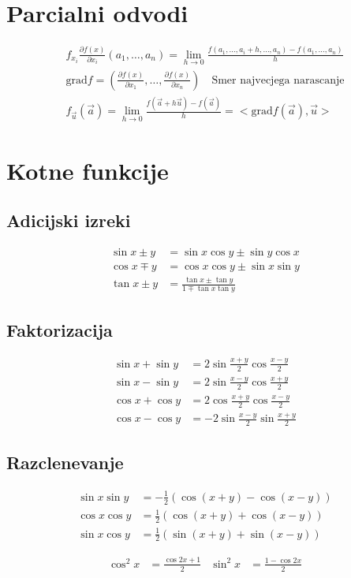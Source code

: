 \documentclass[a4paper,oneside,8pt]{extarticle}
\theoremstyle{definition}
\newcommand{\dpar}[2]{\ensuremath{\frac{\partial #1}{\partial #2}}}
\newcommand\okr[1]{\left(#1\right)}
\begin{document}
\begin{multicols}{2}
	\section*{Parcialni odvodi}
	\begin{align*}
		f_{x_i}\dpar{f(x)}{x_i} (a_1, \dots ,a_n) = \lim_{h \to 0} \frac{f(a_1,\dots,a_i + h, \dots , a_n) - f(a_1,\dots,a_n)}{h}\\
		\text{grad} f = \okr{\dpar{f(x)}{x_1}, \dots, \dpar{f(x)}{x_n}} \quad \text{Smer najvecjega narascanje}\\
		f_{\vec{u}}(\vec{a}) = \lim_{h \to 0} \frac{f(\vec{a} + h\vec{u}) - f(\vec{a})}{h} = <\text{grad} f(\vec{a}), \vec{u}>
	\end{align*}	
%
	\section*{Kotne funkcije}
	\subsection*{Adicijski izreki}
	\begin{align*}
		\sin{x \pm y} &= \sin{x}\cos{y} \pm \sin{y}\cos{x}\\
		\cos{x \mp y} &= \cos{x}\cos{y} \pm \sin{x}\sin{y}\\
		\tan{x \pm y} &= \frac{\tan{x} \pm \tan{y}}{1 \mp \tan{x}\tan{y}}
	\end{align*}
	\subsection*{Faktorizacija}
	\begin{align*}
		\sin{x} + \sin{y} &= 2\sin{\frac{x+y}{2}} \cos{\frac{x-y}{2}}\\
		\sin{x} - \sin{y} &= 2\sin{\frac{x-y}{2}} \cos{\frac{x+y}{2}}\\
		\cos{x} + \cos{y} &= 2\cos{\frac{x+y}{2}} \cos{\frac{x-y}{2}}\\
		\cos{x} - \cos{y} &= -2\sin{\frac{x-y}{2}} \sin{\frac{x+y}{2}}
	\end{align*}
	\subsection*{Razclenevanje}
	\begin{align*}
		\sin{x}\sin{y} &= -\frac{1}{2}\left(\cos{(x+y)} - \cos{(x-y)} \right)\\
		\cos{x}\cos{y} &= \frac{1}{2}\left(\cos{(x+y)} + \cos{(x-y)} \right)\\
		\sin{x}\cos{y} &= \frac{1}{2}\left(\sin{(x+y)} + \sin{(x-y)} \right)
	\end{align*}

	\begin{align*}
		\cos^2{x} &= \frac{\cos{2x} + 1}{2} & \sin^2{x} &= \frac{1 - \cos{2x}}{2}
	\end{align*}	


\end{multicols}
\end{document}
